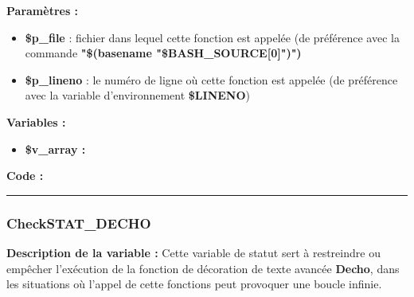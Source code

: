\documentclass[a4paper,10pt]{article}
\begin{document}
\begin{justify}
    \textbf{Paramètres :}

    \begin{itemize}
        \item \color{orange}\textbf{\$p\_file}\color{white} : fichier dans lequel cette fonction est appelée (de préférence avec la commande \textbf{\textbf{"\$(\color{gray}basename \color{white}"\color{orange}\$BASH\_SOURCE[0]\color{white}")")}}\\

        \item \color{orange}\textbf{\$p\_lineno}\color{white} : le numéro de ligne où cette fonction est appelée (de préférence avec la variable d'environnement \textbf{\color{orange}\$LINENO})\\
    \end{itemize}
\end{justify}

\begin{justify}
    \textbf{Variables :}

    \begin{itemize}
        \item \textbf{\color{orange}\$v\_array\color{white} :} \\[1\baselineskip]
    \end{itemize}
\end{justify}

\textbf{Code :}



\color{blue}\par\noindent\rule{\textwidth}{0.4pt}\color{white}

\color{blue}
\subsubsection{CheckSTAT\_DECHO}\color{white}

\begin{justify}
    \textbf{Description de la variable :}
    Cette variable de statut sert à restreindre ou empêcher l'exécution de la fonction de décoration de texte avancée \textbf{\color{mauve}Decho}, dans les situations où l'appel de cette fonctions peut provoquer une boucle infinie.
\end{justify}
\end{document}
